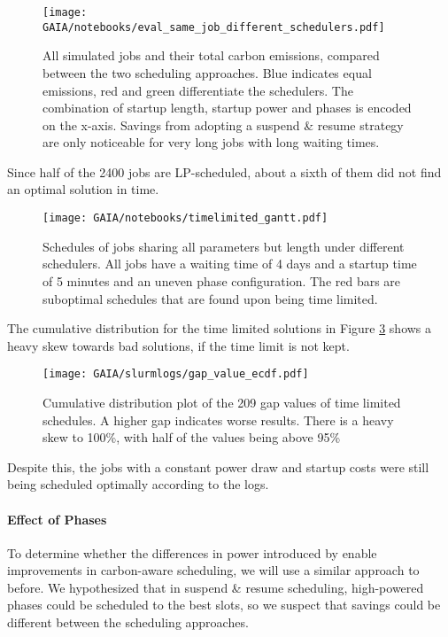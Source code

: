 \begin{figure}[H]
    \texttt{[image: GAIA/notebooks/eval\_same\_job\_different\_schedulers.pdf]}
    \caption[short]{All simulated jobs and their total carbon emissions, compared between the two scheduling approaches. Blue indicates equal emissions, red and green differentiate the schedulers. The combination of startup length, startup power and phases is encoded on the x-axis. Savings from adopting a suspend \& resume strategy are only noticeable for very long jobs with long waiting times.}
    \label{fig:eval_different_schedulers}
\end{figure}

Since half of the 2400 jobs are LP-scheduled, about a sixth of them did not find an optimal solution in time.

\begin{figure}[H]
    \texttt{[image: GAIA/notebooks/timelimited\_gantt.pdf]}
    \caption[short]{Schedules of jobs sharing all parameters but length under different schedulers. All jobs have a waiting time of 4 days and a startup time of 5 minutes and an uneven phase configuration. The red bars are suboptimal schedules that are found upon being time limited.}
    \label{fig:timelimited_gantt}
\end{figure}

The cumulative distribution for the time limited solutions in Figure \ref{fig:ecdf_gap} shows a heavy skew towards bad solutions, if the time limit is not kept.

\begin{figure}[H]
    \texttt{[image: GAIA/slurmlogs/gap\_value\_ecdf.pdf]}
    \caption[short]{Cumulative distribution plot of the 209 gap values of time limited schedules. A higher gap indicates worse results. There is a heavy skew to 100\%, with half of the values being above 95\%}
    \label{fig:ecdf_gap}
\end{figure}

Despite this, the jobs with a constant power draw and startup costs were still being scheduled optimally according to the logs. 

\paragraph{Effect of Phases}

To determine whether the differences in power introduced by \modelname{} enable improvements in carbon-aware scheduling, we will use a similar approach to before. We hypothesized that in suspend \& resume scheduling, high-powered phases could be scheduled to the best slots, so we suspect that savings could be different between the scheduling approaches. 

